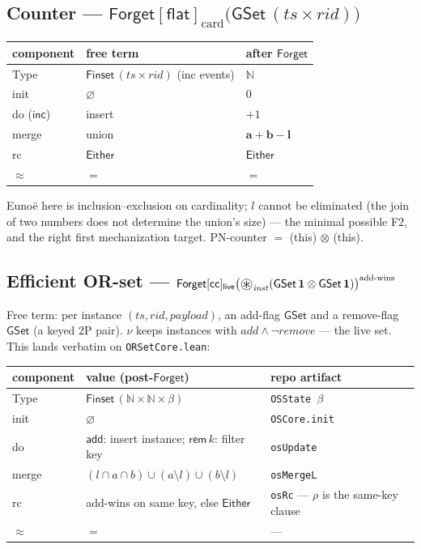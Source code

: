 \documentclass[11pt]{article}
\newcommand{\lean}[1]{\texttt{#1}}
\newcommand{\eqobs}{\approx}
\newcommand{\Forget}{\mathsf{Forget}}
\newcommand{\GSet}{\mathsf{GSet}}
\newcommand{\live}{\mathsf{live}}
\newcommand{\Either}{\mathsf{Either}}
\newcommand{\sepmap}{\mathop{\vcenter{\hbox{\Large$\circledast$}}}}
\newcommand{\ts}{\mathit{ts}}
\newcommand{\rid}{\mathit{rid}}
\newcommand{\cc}{\mathsf{cc}}
\renewcommand{\flat}{\mathsf{flat}}
\begin{document}
\subsection{Counter --- $\Forget[\flat]_{\mathrm{card}}\bigl(\GSet\,(\ts \times \rid)\bigr)$\quad[F2]}

\begin{center}
\begin{tabular}{@{}lll@{}}
\toprule
component & free term & after $\Forget$ \\
\midrule
Type & $\mathsf{Finset}\,(\ts \times \rid)$ (inc events) & $\mathbb{N}$ \\
init & $\varnothing$ & $0$ \\
do ($\mathsf{inc}$) & insert & $+1$ \\
merge & union & $\mathbf{a + b - l}$ \\
rc & $\Either$ & $\Either$ \\
$\eqobs$ & $=$ & $=$ \\
\bottomrule
\end{tabular}
\end{center}

Euno\"e here is inclusion--exclusion on cardinality; $l$ cannot be
eliminated (the join of two numbers does not determine the union's size)
--- the minimal possible F2, and the right first mechanization target.
PN-counter $=$ (this) $\otimes$ (this).

\subsection{Efficient OR-set --- $\Forget[\cc]_{\live}\bigl(\sepmap_{\mathit{inst}} (\GSet\,\mathbf{1} \otimes \GSet\,\mathbf{1})\bigr)^{\text{add-wins}}$\quad[F2]}

Free term: per instance $(\ts, \rid, \mathit{payload})$, an add-flag
$\GSet$ and a remove-flag $\GSet$ (a keyed 2P pair). $\nu$ keeps instances
with $\mathit{add} \wedge \neg\mathit{remove}$ --- the live set. This
lands verbatim on \lean{ORSetCore.lean}:

\begin{center}
\begin{tabular}{@{}lll@{}}
\toprule
component & value (post-$\Forget$) & repo artifact \\
\midrule
Type & $\mathsf{Finset}\,(\mathbb{N} \times \mathbb{N} \times \beta)$
     & \lean{OSState $\beta$} \\
init & $\varnothing$ & \lean{OSCore.init} \\
do & $\mathsf{add}$: insert instance; $\mathsf{rem}\,k$: filter key
   & \lean{osUpdate} \\
merge & $(l \cap a \cap b) \cup (a \setminus l) \cup (b \setminus l)$
      & \lean{osMergeL} \\
rc & add-wins on same key, else $\Either$
   & \lean{osRc} --- $\rho$ is the same-key clause \\
$\eqobs$ & $=$ & --- \\
\bottomrule
\end{tabular}
\end{center}
\end{document}
